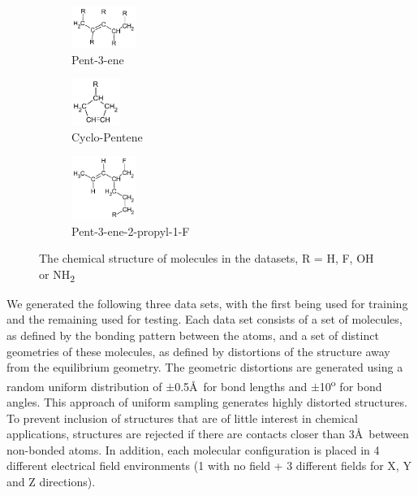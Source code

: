 \documentclass[twoside,11pt]{article}
\begin{document}
\begin{figure}[h!]
\centering
\begin{subfigure}{.3\textwidth}
  \centering
  \includegraphics[width=80px]{pent3ene.pdf}
  \caption{Pent-3-ene}
  \label{fig:pent3ene}
\end{subfigure}%
\begin{subfigure}{.3\textwidth}
  \centering
  \includegraphics[width=60px]{RcycloPenteneHs.pdf}
  \caption{Cyclo-Pentene}
  \label{fig:cycloPen}
\end{subfigure}
\begin{subfigure}{.3\textwidth}
  \centering
  \includegraphics[width=80px]{pent3ene2propNOF.pdf}
  \caption{Pent-3-ene-2-propyl-1-F}
  \label{fig:propSub}
\end{subfigure}
\caption{The chemical structure of molecules in the datasets, R = H, F, OH or NH\textsubscript{2}}
\label{fig:Molecules}
\end{figure}
We generated the following three data sets, with the first being used for training and the remaining used for testing. Each data set consists of a set of molecules, as defined by the bonding pattern between the atoms, and a set of distinct geometries of these molecules, as defined by distortions of the structure away from the equilibrium geometry. The geometric distortions are generated using a random uniform distribution of $\pm$0.5\AA\ for bond lengths and $\pm$10\textsuperscript{o} for bond angles.  This approach of uniform sampling generates highly distorted structures. To prevent inclusion of structures that are of little interest in chemical applications, structures are rejected if there are contacts closer than 3\AA\ between non-bonded atoms.  In addition, each molecular configuration is placed in 4 different electrical field environments (1 with no field + 3 different fields for X, Y and Z directions).
\end{document}

